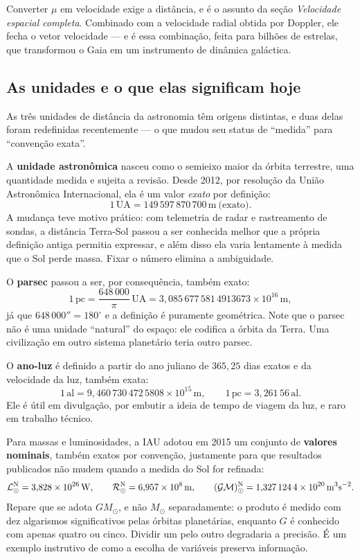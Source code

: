 \documentclass[11pt,a4paper]{article}
\begin{document}
Converter $\mu$ em velocidade exige a distância, e é o assunto da seção \emph{Velocidade espacial completa}. Combinado com a velocidade radial obtida por Doppler, ele fecha o vetor velocidade --- e é essa combinação, feita para bilhões de estrelas, que transformou o Gaia em um instrumento de dinâmica galáctica.

\subsection*{As unidades e o que elas significam hoje}

As três unidades de distância da astronomia têm origens distintas, e duas delas foram redefinidas recentemente --- o que mudou seu status de ``medida'' para ``convenção exata''.

A \textbf{unidade astronômica} nasceu como o semieixo maior da órbita terrestre, uma quantidade medida e sujeita a revisão. Desde 2012, por resolução da União Astronômica Internacional, ela é um valor \emph{exato} por definição:
\[
1\,\mathrm{UA}=149\,597\,870\,700\,\mathrm{m}\ \text{(exato)}.
\]
A mudança teve motivo prático: com telemetria de radar e rastreamento de sondas, a distância Terra-Sol passou a ser conhecida melhor que a própria definição antiga permitia expressar, e além disso ela varia lentamente à medida que o Sol perde massa. Fixar o número elimina a ambiguidade.

O \textbf{parsec} passou a ser, por consequência, também exato:
\[
1\,\mathrm{pc}=\frac{648\,000}{\pi}\,\mathrm{UA}=3{,}085\,677\,581\,4913673\times10^{16}\,\mathrm{m},
\]
já que $648\,000''=180^\circ$ e a definição é puramente geométrica. Note que o parsec não é uma unidade ``natural'' do espaço: ele codifica a órbita da Terra. Uma civilização em outro sistema planetário teria outro parsec.

O \textbf{ano-luz} é definido a partir do ano juliano de $365{,}25$ dias exatos e da velocidade da luz, também exata:
\[
1\,\mathrm{al}=9{,}460\,730\,472\,5808\times10^{15}\,\mathrm{m},
\qquad
1\,\mathrm{pc}=3{,}261\,56\,\mathrm{al}.
\]
Ele é útil em divulgação, por embutir a ideia de tempo de viagem da luz, e raro em trabalho técnico.

Para massas e luminosidades, a IAU adotou em 2015 um conjunto de \textbf{valores nominais}, também exatos por convenção, justamente para que resultados publicados não mudem quando a medida do Sol for refinada:
\[
\mathcal{L}^{\rm N}_\odot=3{,}828\times10^{26}\,\mathrm{W},
\qquad
\mathcal{R}^{\rm N}_\odot=6{,}957\times10^{8}\,\mathrm{m},
\qquad
(\mathcal{GM})^{\rm N}_\odot=1{,}327\,124\,4\times10^{20}\,\mathrm{m^{3}s^{-2}}.
\]
Repare que se adota $GM_\odot$, e não $M_\odot$ separadamente: o produto é medido com dez algarismos significativos pelas órbitas planetárias, enquanto $G$ é conhecido com apenas quatro ou cinco. Dividir um pelo outro degradaria a precisão. É um exemplo instrutivo de como a escolha de variáveis preserva informação.
\end{document}
